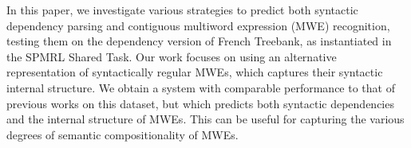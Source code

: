 In this paper, we investigate various strategies to predict both syntactic dependency parsing and contiguous multiword expression (MWE) recognition, testing them on the dependency version of French Treebank, as instantiated in the SPMRL Shared Task. Our work focuses on using an alternative representation of syntactically regular MWEs, which captures their syntactic internal structure. We obtain a system with comparable performance to that of previous works on this dataset, but which predicts both syntactic dependencies and the internal structure of MWEs. This can be useful for capturing the various degrees of semantic compositionality of MWEs.
